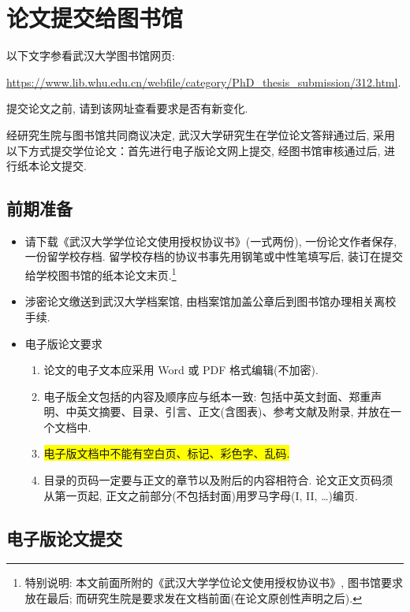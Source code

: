 \chapter{论文提交给图书馆}

{\kaishu 以下文字参看武汉大学图书馆网页:
 \begin{center}
 \url{https://www.lib.whu.edu.cn/webfile/category/PhD_thesis_submission/312.html}.
 \end{center}
 提交论文之前, 请到该网址查看要求是否有新变化.
}

    经研究生院与图书馆共同商议决定, 武汉大学研究生在学位论文答辩通过后,
    采用以下方式提交学位论文：首先进行电子版论文网上提交, 经图书馆审核通过后, 进行纸本论文提交.

\section*{前期准备}
\begin{itemize}
  \item[一、] 请下载《武汉大学学位论文使用授权协议书》(一式两份), 一份论文作者保存, 一份留学校存档.
    留学校存档的协议书事先用钢笔或中性笔填写后,  装订在提交给学校图书馆的纸本论文末页.\footnote{\heiti 特别说明:
    本文前面所附的《武汉大学学位论文使用授权协议书》, 图书馆要求放在最后;
    而研究生院是要求发在文档前面(在论文原创性声明之后). }

    \item[二、]涉密论文缴送到武汉大学档案馆, 由档案馆加盖公章后到图书馆办理相关离校手续.

    \item[三、]电子版论文要求
\begin{enumerate}
  \item 论文的电子文本应采用 Word 或 PDF 格式编辑(不加密).
  \item 电子版全文包括的内容及顺序应与纸本一致: 包括中英文封面、郑重声明、中英文摘要、目录、引言、正文(含图表)、参考文献及附录, 并放在一个文档中.
  \item \colorbox{yellow}{电子版文档中不能有空白页、标记、彩色字、乱码.}
  \item 目录的页码一定要与正文的章节以及附后的内容相符合. 论文正文页码须从第一页起, 正文之前部分(不包括封面)用罗马字母(I, II, \dots)编页.
\end{enumerate}
\end{itemize}



\section*{电子版论文提交}


